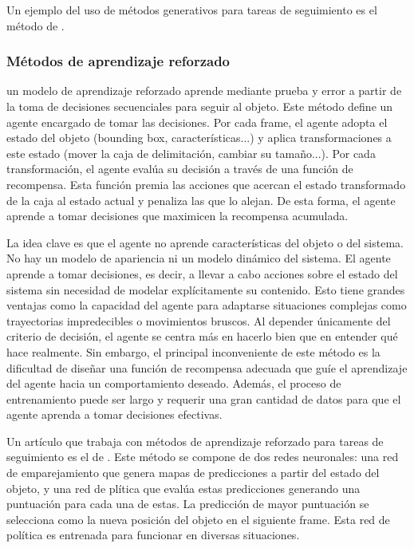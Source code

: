 Un ejemplo del uso de métodos generativos para tareas de seguimiento es el método de \cite{Robust_L1_Tracker}.

\subsubsection{Métodos de aprendizaje reforzado}
un modelo de aprendizaje reforzado aprende mediante prueba y error a partir de la toma de decisiones secuenciales para seguir al objeto. 
Este método define un agente encargado de tomar las decisiones. Por cada frame, el agente adopta el estado del objeto (bounding box, características...) y aplica transformaciones a este estado (mover la caja de delimitación, cambiar su tamaño...). Por cada transformación, el agente evalúa su decisión a través de una función de recompensa. Esta función premia las acciones que acercan el estado transformado de la caja al estado actual y penaliza las que lo alejan. De esta forma, el agente aprende a tomar decisiones que maximicen la recompensa acumulada. 

La idea clave es que el agente no aprende características del objeto o del sistema. No hay un modelo de apariencia ni un modelo dinámico del sistema. El agente aprende a tomar decisiones, es decir, a llevar a cabo acciones sobre el estado del sistema sin necesidad de modelar explícitamente su contenido. Esto tiene grandes ventajas como la capacidad del agente para adaptarse situaciones complejas como trayectorias impredecibles o movimientos bruscos. Al depender únicamente del criterio de decisión, el agente se centra más en hacerlo bien que en entender qué hace realmente. Sin embargo, el principal inconveniente de este método es la dificultad de diseñar una función de recompensa adecuada que guíe el aprendizaje del agente hacia un comportamiento deseado. Además, el proceso de entrenamiento puede ser largo y requerir una gran cantidad de datos para que el agente aprenda a tomar decisiones efectivas.

Un artículo que trabaja con métodos de aprendizaje reforzado para tareas de seguimiento es el de \cite{RL_Tracking}. Este método se compone de dos redes neuronales: una red de emparejamiento que genera mapas de predicciones a partir del estado del objeto, y una red de plítica que evalúa estas predicciones generando una puntuación para cada una de estas. La predicción de mayor puntuación se selecciona como la nueva posición del objeto en el siguiente frame. Esta red de política es entrenada para funcionar en diversas situaciones. 

